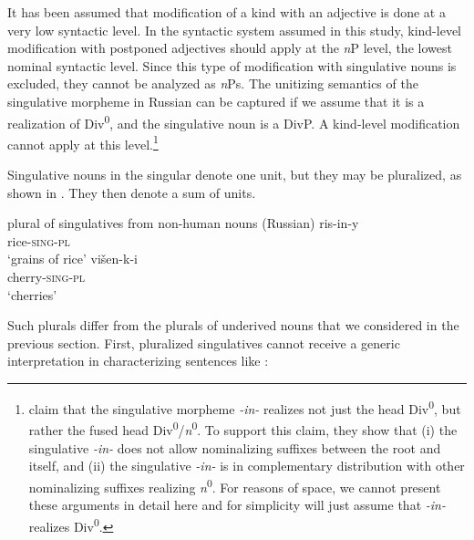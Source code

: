 \documentclass[output=paper,colorlinks,citecolor=brown]{langscibook}
\begin{document}
It has been assumed that modification of a kind with an adjective is done at a very low syntactic level. In the syntactic system assumed in this study, kind-level modification with postponed adjectives should apply at the \textit{n}P level, the lowest nominal syntactic level. Since this type of modification with singulative nouns is excluded, they cannot be analyzed as \textit{n}Ps. The unitizing semantics of the singulative morpheme in Russian can be captured if we assume that it is a realization of Div\textsuperscript{0}, and the singulative noun is a DivP. A kind-level modification cannot apply at this level.\footnote{\citet{ErschlerGeistKagan} claim that the singulative morpheme \textit{-in-} realizes not just the head Div\textsuperscript{0}, but rather the fused head Div\textsuperscript{0}/\textit{n}\textsuperscript{0}. To support this claim, they show that (i) the singulative \textit{-in-} does not allow nominalizing suffixes between the root and itself, and (ii) the singulative \textit{-in-} is in complementary distribution with other nominalizing suffixes realizing \textit{n}\textsuperscript{0}. For reasons of space, we cannot present these arguments in detail here and for simplicity will just assume that \textit{-in-} realizes Div\textsuperscript{0}.}

Singulative nouns in the singular denote one unit, but they may be pluralized, as shown in . They then denote a sum of units.

\ea\label{ex:geist:26}
plural of singulatives from non-human nouns \hfill (Russian)
\ea\label{ex:geist:26a}
\gll ris-in-y \\
rice-\textsc{sing-pl} \\
\glt `grains of rice'
\ex\label{ex:geist:26b}
\gll višen-k-i \\
cherry-\textsc{sing-pl} \\
\glt `cherries'
\z\z

\noindent Such plurals differ from the plurals of underived nouns that we considered in the previous section. First, pluralized singulatives cannot receive a generic interpretation in characterizing sentences like :

\label{ex:geist:27}
\z
\end{document}
